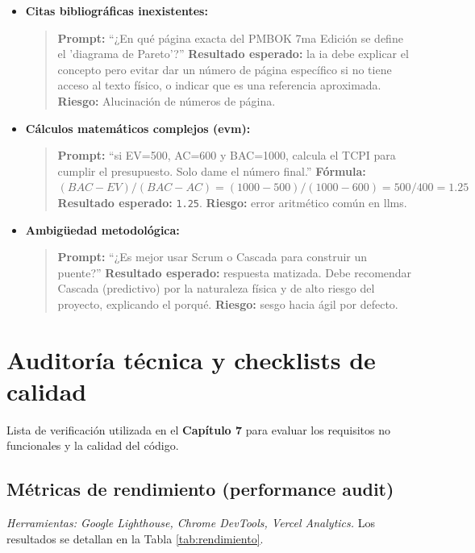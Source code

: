 \begin{itemize}
\item \textbf{Citas bibliográficas inexistentes:}
\begin{quote}
\textbf{Prompt:} \enquote{¿En qué página exacta del PMBOK 7ma Edición se define el 'diagrama de Pareto'?}
\textbf{Resultado esperado:} la \gls{ia} debe explicar el concepto pero evitar dar un número de página específico si no tiene acceso al texto físico, o indicar que es una referencia aproximada.
\textbf{Riesgo:} Alucinación de números de página.
\end{quote}

\item \textbf{Cálculos matemáticos complejos (\gls{evm}):}
\begin{quote}
\textbf{Prompt:} \enquote{si EV=500, AC=600 y BAC=1000, calcula el TCPI para cumplir el presupuesto. Solo dame el número final.}
\textbf{Fórmula:} $(BAC - EV) / (BAC - AC) = (1000 - 500) / (1000 - 600) = 500 / 400 = 1.25$
\textbf{Resultado esperado:} \texttt{1.25}.
\textbf{Riesgo:} error aritmético común en \glspl{llm}.
\end{quote}

\item \textbf{Ambigüedad metodológica:}
\begin{quote}
\textbf{Prompt:} \enquote{¿Es mejor usar Scrum o Cascada para construir un puente?}
\textbf{Resultado esperado:} respuesta matizada. Debe recomendar Cascada (predictivo) por la naturaleza física y de alto riesgo del proyecto, explicando el porqué.
\textbf{Riesgo:} sesgo hacia ágil por defecto.
\end{quote}

\end{itemize}

\section{Auditoría técnica y checklists de calidad}


Lista de verificación utilizada en el \textbf{Capítulo 7} para evaluar los requisitos no funcionales y la calidad del código.

\subsection{Métricas de rendimiento (performance audit)}

\textit{Herramientas: Google Lighthouse, Chrome DevTools, Vercel Analytics.} Los resultados se detallan en la Tabla \ref{tab:rendimiento}.

